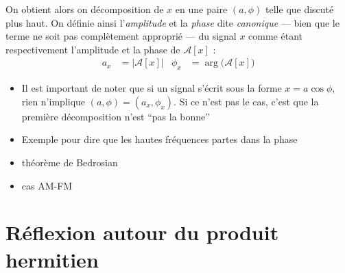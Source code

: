 \begin{definition}\label{def:ampli&phase_cano}
	On obtient alors on décomposition de $x$ en une paire $(a,\phi)$ telle que discuté plus haut. On définie ainsi l'\emph{amplitude} et la \emph{phase}  dite \emph{canonique} --- bien que le terme ne soit pas complètement approprié --- du signal $x$ comme étant respectivement l'amplitude et la phase de $\mathcal{A}[x]$ :
	\begin{align}\label{eq:ampli&phase_cano}
		a_x &= \big|\mathcal{A}[x]\big|   &   \phi_x &= \arg\big(\mathcal{A}[x]\big)
	\end{align}
\end{definition}



\begin{itemize}
	
	\item Il est important de noter que si un signal s'écrit sous la forme  $x=a\cos\phi$, rien n'implique $(a,\phi)=(a_x,\phi_x)$. Si ce n'est pas le cas, c'est que la première décomposition n'est ``pas la bonne''
	
	\item Exemple pour dire que les hautes fréquences partes dans la phase
	
	\item théorème de Bedrosian \cite{venouziou_characterizing_2008}
	
	\item cas AM-FM

\end{itemize}




\section{Réflexion autour du produit hermitien}


